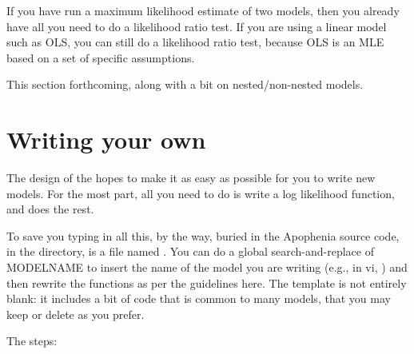 If you have run a maximum likelihood estimate of two models, then you
already have all you need to do a likelihood ratio test. 
If you are using a linear model such as OLS, you can still do a
likelihood ratio test, because OLS is an MLE based on a set of specific
assumptions.

This section forthcoming, along with a bit on nested/non-nested models.

\section{Writing your own} \label{writeyourown}
The design of the  hopes to make it as easy as
possible for you to write new models. For the most
part, all you need to do is write a log likelihood function, and
 does the rest.  

To save you typing in all this, by the way, buried in the Apophenia
source code, in the  directory, is a file named
.  
You can do a global search-and-replace of MODELNAME to insert the name
of the model you are writing (e.g., in vi, )
and then rewrite the functions as per the guidelines here. The template
is not entirely blank: it includes a bit of code that is common to many
models, that you may keep or delete as you prefer.

The steps:

